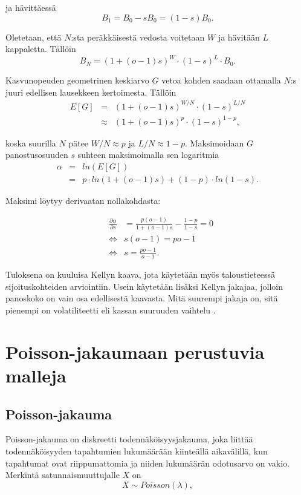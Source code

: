 \documentclass[a4paper,finnish,titlepage,12pt]{article}
\begin{document}
ja hävittäessä
\begin{equation}
	B_{1} = B_0 - sB_0 = (1 - s) B_0.
\end{equation}

Oletetaan, että $N$:sta peräkkäisestä vedosta voitetaan $W$ ja hävitään $L$ kappaletta. Tällöin
\begin{equation}
	B_{N} = (1 + (o-1)s)^{W} \cdot (1 - s)^{L} \cdot B_{0}.
\end{equation}

Kasvunopeuden geometrinen keskiarvo $G$ vetoa kohden saadaan ottamalla $N$:s juuri edellisen lausekkeen kertoimesta. Tällöin
\begin{eqnarray}
	E[G] &=& (1 + (o-1)s)^{W/N} \cdot (1 - s)^{L/N} \\
	&\approx& (1 + (o-1)s)^p \cdot (1 - s)^{1-p},
\end{eqnarray}

koska suurilla $N$ pätee $W/N \approx p$ ja $L/N \approx 1-p$. Maksimoidaan $G$ panostusosuuden $s$ suhteen maksimoimalla sen logaritmia
\begin{eqnarray}
	\alpha &=& ln (E[G]) \\
	&=& p \cdot ln(1+(o-1)s) + (1-p) \cdot ln(1-s).
\end{eqnarray}

Maksimi löytyy derivaatan nollakohdasta:

\begin{eqnarray}
	&\frac{\partial \alpha}{\partial s}& = \frac{p(o-1)}{1+(o-1)s} - \frac{1-p}{1-s} = 0 \\
	&\Leftrightarrow& s(o-1) = po - 1 \\
	&\Leftrightarrow& s = \frac{po-1}{o-1}.
\end{eqnarray}

Tuloksena on kuuluisa Kellyn kaava, jota käytetään myös taloustieteessä sijoituskohteiden arviointiin. Usein käytetään lisäksi Kellyn jakajaa, jolloin panoskoko on vain osa edellisestä kaavasta. Mitä suurempi jakaja on, sitä pienempi on volatiliteetti eli kassan suuruuden vaihtelu \cite{divider}.

\section{Poisson-jakaumaan perustuvia malleja}

\subsection{Poisson-jakauma}
Poisson-jakauma on diskreetti todennäköisyysjakauma, joka liittää todennäköisyyden tapahtumien lukumäärään kiinteällä aikavälillä, kun tapahtumat ovat riippumattomia ja niiden lukumäärän odotusarvo on vakio. Merkintä satunnaismuuttujalle $X$ on
\begin{equation}
	X \sim Poisson(\lambda),
\end{equation}
\end{document}
